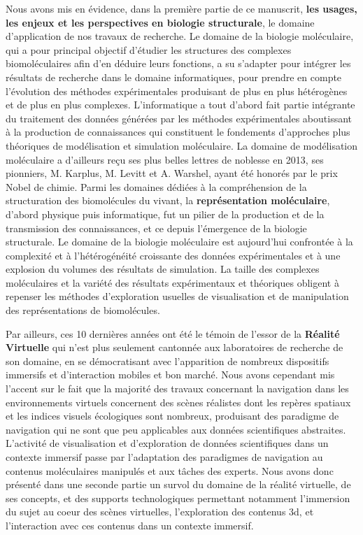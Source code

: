 Nous avons mis en évidence, dans la première partie de ce manuscrit, \textbf{les usages, les enjeux et les perspectives en biologie structurale}, le domaine d'application de nos travaux de recherche. Le domaine de la biologie moléculaire, qui a pour principal objectif d'étudier les structures des complexes biomoléculaires afin d'en déduire leurs fonctions, a su s'adapter pour intégrer les résultats de recherche dans le domaine informatiques, pour prendre en compte l'évolution des méthodes expérimentales produisant de plus en plus hétérogènes et de plus en plus complexes. L'informatique a tout d'abord fait partie intégrante du traitement des données générées par les méthodes expérimentales aboutissant à la production de connaissances qui constituent le fondements d'approches plus théoriques de modélisation et simulation moléculaire. La domaine de modélisation moléculaire a d'ailleurs reçu ses plus belles lettres de noblesse en 2013, ses pionniers, M. Karplus, M. Levitt et A. Warshel, ayant été honorés par le prix Nobel de chimie.  Parmi les domaines dédiées à la compréhension de la structuration des biomolécules du vivant, la \textbf{représentation moléculaire}, d'abord physique puis informatique, fut un pilier de la production et de la transmission des connaissances, et ce depuis l'émergence de la biologie structurale. Le domaine de la biologie moléculaire est aujourd'hui confrontée à la complexité et à l'hétérogénéité croissante des données expérimentales et à une explosion du volumes des résultats de simulation. La taille des complexes moléculaires et la variété des résultats expérimentaux et théoriques obligent à repenser les méthodes d'exploration usuelles de visualisation et de manipulation des représentations de biomolécules.


Par ailleurs, ces 10 dernières années ont été le témoin de l'essor de la \textbf{Réalité Virtuelle} qui n'est plus seulement cantonnée aux laboratoires de recherche de son domaine, en se démocratisant avec l'apparition de nombreux dispositifs immersifs et d'interaction mobiles et bon marché. Nous avons cependant mis l'accent sur le fait que la majorité des travaux concernant la navigation dans les environnements virtuels concernent des scènes réalistes dont les repères spatiaux et les indices visuels écologiques sont nombreux, produisant des paradigme de navigation qui ne sont que peu applicables aux données scientifiques abstraites. L'activité de visualisation et d'exploration de données scientifiques dans un contexte immersif passe par l'adaptation des paradigmes de navigation au contenus moléculaires manipulés et aux tâches des experts.  Nous avons donc présenté dans une seconde partie un survol du domaine de la réalité virtuelle, de ses concepts, et des supports technologiques permettant notamment l'immersion du sujet au coeur des scènes virtuelles, l'exploration des contenus 3d, et l'interaction avec ces contenus dans un contexte immersif.


